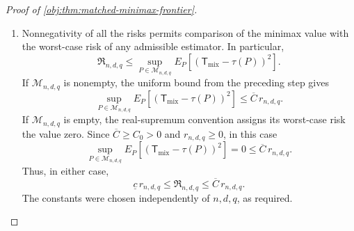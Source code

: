 \begin{proof}[Proof of \cref{obj:thm:matched-minimax-frontier}]
\begin{enumerate}
\item Nonnegativity of all the risks permits comparison of the minimax value with the worst-case risk of any admissible estimator. In particular,
\[
\mathfrak R_{n,d,q}
\le
\sup_{P\in\mathcal M_{n,d,q}}
E_P\!\left[(\mathsf T_{\mathrm{mix}}-\tau(P))^2\right].
\]
If \(\mathcal M_{n,d,q}\) is nonempty, the uniform bound from the preceding step gives
\[
\sup_{P\in\mathcal M_{n,d,q}}
E_P\!\left[(\mathsf T_{\mathrm{mix}}-\tau(P))^2\right]
\le\overline C\,r_{n,d,q}.
\]
If \(\mathcal M_{n,d,q}\) is empty, the real-supremum convention assigns its worst-case risk the value zero. Since \(\overline C\ge C_0>0\) and \(r_{n,d,q}\ge0\), in this case
\[
\sup_{P\in\mathcal M_{n,d,q}}
E_P\!\left[(\mathsf T_{\mathrm{mix}}-\tau(P))^2\right]
=0\le\overline C\,r_{n,d,q}.
\]
Thus, in either case,
\[
\underline c\,r_{n,d,q}
\le\mathfrak R_{n,d,q}
\le\overline C\,r_{n,d,q}.
\]
The constants were chosen independently of \(n,d,q\), as required.
\end{enumerate}
\end{proof}

